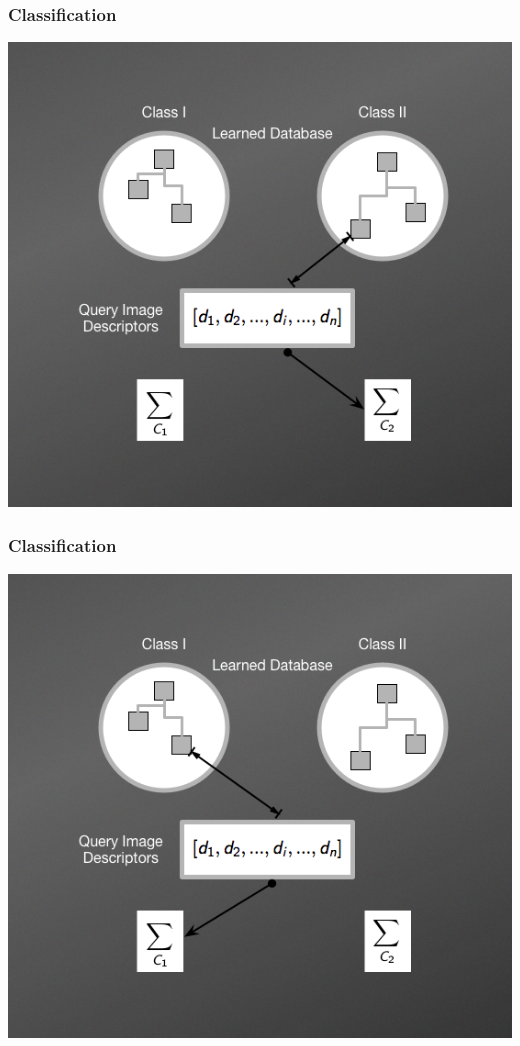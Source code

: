 \documentclass[aspectratio=169]{beamer}
\begin{document}
    \begin{frame}
        \frametitle{Classification}
        \begin{center}
            \item \includegraphics[scale=0.38]{images/NBNNMethod2.png}        
        \end{center}
    \end{frame}
    
    \begin{frame}
        \frametitle{Classification}
        \begin{center}
            \item \includegraphics[scale=0.38]{images/NBNNMethod3.png}    
        \end{center}
    \end{frame}    
\end{document}
